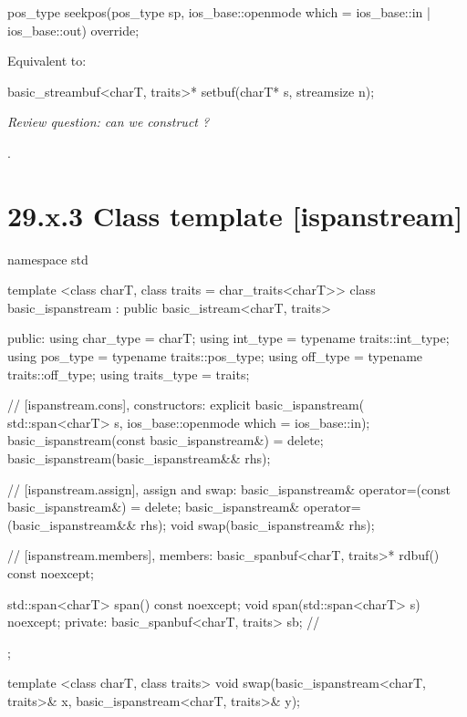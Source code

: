 \documentclass[ebook,11pt,article]{memoir}
\renewcommand{\iref}[1]{[#1]}
\begin{document}
\begin{itemdecl}
pos_type seekpos(pos_type sp,
                 ios_base::openmode which
                   = ios_base::in | ios_base::out) override;
\end{itemdecl}

\begin{itemdescr}
\pnum
\effects
Equivalent to: 
\end{itemdescr}

\begin{itemdecl}
basic_streambuf<charT, traits>* setbuf(charT* s, streamsize n);
\end{itemdecl}

\begin{itemdescr}
\pnum
\effects
{}

\emph{Review question: can we construct  ?}

\pnum
\returns
{}.
\end{itemdescr} 

\section{29.x.3 Class template  [ispanstream] }

\begin{codeblock}
namespace std {
  template <class charT, class traits = char_traits<charT>>
  class basic_ispanstream
    : public basic_istream<charT, traits> {
  public:
    using char_type      = charT;
    using int_type       = typename traits::int_type;
    using pos_type       = typename traits::pos_type;
    using off_type       = typename traits::off_type;
    using traits_type    = traits;

    // \iref{ispanstream.cons}, constructors:
    explicit basic_ispanstream(
      std::span<charT> s,
      ios_base::openmode which = ios_base::in);
    basic_ispanstream(const basic_ispanstream&) = delete;
    basic_ispanstream(basic_ispanstream&& rhs);

    // \iref{ispanstream.assign}, assign and swap:
    basic_ispanstream& operator=(const basic_ispanstream&) = delete;
    basic_ispanstream& operator=(basic_ispanstream&& rhs);
    void swap(basic_ispanstream& rhs);

    // \iref{ispanstream.members}, members:
    basic_spanbuf<charT, traits>* rdbuf() const noexcept;

    std::span<charT> span() const noexcept;
    void span(std::span<charT> s) noexcept;
  private:
    basic_spanbuf<charT, traits> sb; // \expos
  };

  template <class charT, class traits>
    void swap(basic_ispanstream<charT, traits>& x,
              basic_ispanstream<charT, traits>& y);
}
\end{codeblock}
\end{document}
